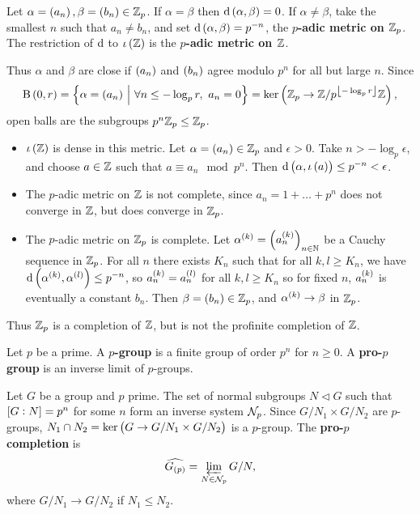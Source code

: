 \begin{definition}
Let $ \alpha = \br{a_n}, \beta = \br{b_n} \in \ZZ_p $. If $ \alpha = \beta $ then $ \d\br{\alpha, \beta} = 0 $. If $ \alpha \ne \beta $, take the smallest $ n $ such that $ a_n \ne b_n $, and set $ \d\br{\alpha, \beta} = p^{-n} $, the \textbf{$ p $-adic metric on $ \mathbb{Z}_p $}. The restriction of $ \mathrm{d} $ to $ \iota\br{\ZZ} $ is the \textbf{$ p $-adic metric on $ \mathbb{Z} $}.
\end{definition}

Thus $ \alpha $ and $ \beta $ are close if $ \br{a_n} $ and $ \br{b_n} $ agree modulo $ p^n $ for all but large $ n $. Since
$$ \B\br{0, r} = \cbr{\alpha = \br{a_n} \st \forall n \le -\log_p r, \ a_n = 0} = \ker \br{\ZZ_p \to \ZZ / p^{\fbr{-\log_p r}}\ZZ}, $$
open balls are the subgroups $ p^n\mathbb{Z}_p \le \mathbb{Z}_p $.

\begin{itemize}
\item $ \iota\br{\ZZ} $ is dense in this metric. Let $ \alpha = \br{a_n} \in \ZZ_p $ and $ \epsilon > 0 $. Take $ n > -\log_p \epsilon $, and choose $ a \in \mathbb{Z} $ such that $ a \equiv a_n \mod p^n $. Then $ \d\br{\alpha, \iota\br{a}} \le p^{-n} < \epsilon $.
\item The $ p $-adic metric on $ \mathbb{Z} $ is not complete, since $ a_n = 1 + \dots + p^n $ does not converge in $ \mathbb{Z} $, but does converge in $ \mathbb{Z}_p $.
\item The $ p $-adic metric on $ \mathbb{Z}_p $ is complete. Let $ \alpha^{\br{k}} = \br{a_n^{\br{k}}}_{n \in \NN} $ be a Cauchy sequence in $ \mathbb{Z}_p $. For all $ n $ there exists $ K_n $ such that for all $ k, l \ge K_n $, we have $ \d\br{\alpha^{\br{k}}, \alpha^{\br{l}}} \le p^{-n} $, so $ a_n^{\br{k}} = a_n^{\br{l}} $ for all $ k, l \ge K_n $ so for fixed $ n $, $ a_n^{\br{k}} $ is eventually a constant $ b_n $. Then $ \beta = \br{b_n} \in \ZZ_p $, and $ \alpha^{\br{k}} \to \beta $ in $ \mathbb{Z}_p $.
\end{itemize}

Thus $ \mathbb{Z}_p $ is a completion of $ \mathbb{Z} $, but is not the profinite completion of $ \mathbb{Z} $.

\begin{definition}
Let $ p $ be a prime. A \textbf{$ p $-group} is a finite group of order $ p^n $ for $ n \ge 0 $. A \textbf{pro-$ p $ group} is an inverse limit of $ p $-groups.
\end{definition}

\begin{definition}
Let $ G $ be a group and $ p $ prime. The set of normal subgroups $ N \triangleleft G $ such that $ \sbr{G : N} = p^n $ for some $ n $ form an inverse system $ \mathcal{N}_p $. Since $ G / N_1 \times G / N_2 $ are $ p $-groups, $ N_1 \cap N_2 = \ker \br{G \to G / N_1 \times G / N_2} $ is a $ p $-group. The \textbf{pro-$ p $ completion} is
$$ \widehat{G_{\br{p}}} = \varprojlim_{N \in \NNN_p} G / N, $$
where $ G / N_1 \to G / N_2 $ if $ N_1 \le N_2 $.
\end{definition}

